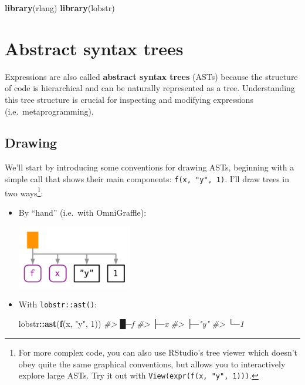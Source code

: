 \documentclass[]{book}
\newenvironment{Shaded}{\begin{snugshade}}{\end{snugshade}}
\newcommand{\CommentTok}[1]{\textcolor[rgb]{0.37,0.37,0.37}{\textit{#1}}}
\newcommand{\DecValTok}[1]{\textcolor[rgb]{0.06,0.06,0.06}{#1}}
\newcommand{\KeywordTok}[1]{\textcolor[rgb]{0.27,0.27,0.27}{\textbf{#1}}}
\newcommand{\NormalTok}[1]{#1}
\newcommand{\OperatorTok}[1]{\textcolor[rgb]{0.43,0.43,0.43}{\textbf{#1}}}
\newcommand{\StringTok}[1]{\textcolor[rgb]{0.5,0.5,0.5}{#1}}
\let\rmarkdownfootnote\footnote%
\def\footnote{\protect\rmarkdownfootnote}
\begin{document}
\begin{Shaded}
\begin{Highlighting}[]
\KeywordTok{library}\NormalTok{(rlang)}
\KeywordTok{library}\NormalTok{(lobstr)}
\end{Highlighting}
\end{Shaded}

\hypertarget{ast}{%
\section{Abstract syntax trees}\label{ast}}


Expressions are also called \textbf{abstract syntax trees} (ASTs) because the structure of code is hierarchical and can be naturally represented as a tree. Understanding this tree structure is crucial for inspecting and modifying expressions (i.e.~metaprogramming).

\hypertarget{drawing}{%
\subsection{Drawing}\label{drawing}}


We'll start by introducing some conventions for drawing ASTs, beginning with a simple call that shows their main components: \texttt{f(x,\ "y",\ 1)}. I'll draw trees in two ways\footnote{For more complex code, you can also use RStudio's tree viewer which doesn't obey quite the same graphical conventions, but allows you to interactively explore large ASTs. Try it out with \texttt{View(expr(f(x,\ "y",\ 1)))}.}:

\begin{itemize}
\item
  By ``hand'' (i.e.~with OmniGraffle):

  \begin{center}\includegraphics[width=1.97in]{diagrams/expressions/simple} \end{center}
\item
  With \texttt{lobstr::ast()}:

\begin{Shaded}
\begin{Highlighting}[]
\NormalTok{lobstr}\OperatorTok{::}\KeywordTok{ast}\NormalTok{(}\KeywordTok{f}\NormalTok{(x, }\StringTok{"y"}\NormalTok{, }\DecValTok{1}\NormalTok{))}
\CommentTok{#> █─f }
\CommentTok{#> ├─x }
\CommentTok{#> ├─"y" }
\CommentTok{#> └─1}
\end{Highlighting}
\end{Shaded}
\end{itemize}
\end{document}
